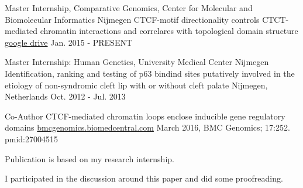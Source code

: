 

\begin{cventries}

  \cventry
    {Master Internship, Comparative Genomics,  Center for Molecular and Biomolecular Informatics Nijmegen} %
    {CTCF-motif directionality controls CTCT-mediated chromatin interactions and correlares with topological domain structure} %
    {\href{https://drive.google.com/file/d/1fE28UxBNoNXvjtaJWrduGhyCLluwIuqX/view?usp=sharing}{google drive}} %
    {Jan. 2015 - PRESENT} %
    {}

  \cventry
    {Master Internship: Human Genetics, University Medical Center Nijmegen} %
    {Identification, ranking and testing of p63 bindind sites putatively involved in the etiology of non-syndromic cleft lip with or without cleft palate} %
    {Nijmegen, Netherlands} %
    {Oct. 2012 - Jul. 2013} %
    {}


  \cventry
    {Co-Author}
    {CTCF-mediated chromatin loops enclose inducible gene regulatory domains} %
    {\href{https://www.ncbi.nlm.nih.gov/pmc/articles/PMC4804521/pdf/12864_2016_Article_2516.pdf}{bmcgenomics.biomedcentral.com}}
    {March 2016, BMC Genomics; 17:252. pmid:27004515} %
    {
      \begin{cvitems}
        \item {Publication is based on my research internship.}
        \item {I participated in the discussion around this paper and did some proofreading.}
      \end{cvitems}
    }
\end{cventries}
